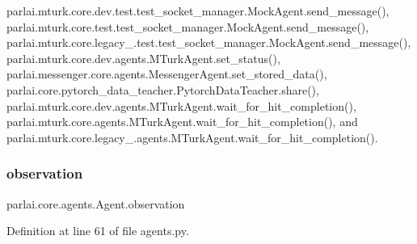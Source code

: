 parlai.\+mturk.\+core.\+dev.\+test.\+test\+\_\+socket\+\_\+manager.\+Mock\+Agent.\+send\+\_\+message(), parlai.\+mturk.\+core.\+test.\+test\+\_\+socket\+\_\+manager.\+Mock\+Agent.\+send\+\_\+message(), parlai.\+mturk.\+core.\+legacy\+\_.\+test.\+test\+\_\+socket\+\_\+manager.\+Mock\+Agent.\+send\+\_\+message(), parlai.\+mturk.\+core.\+dev.\+agents.\+M\+Turk\+Agent.\+set\+\_\+status(), parlai.\+messenger.\+core.\+agents.\+Messenger\+Agent.\+set\+\_\+stored\+\_\+data(), parlai.\+core.\+pytorch\+\_\+data\+\_\+teacher.\+Pytorch\+Data\+Teacher.\+share(), parlai.\+mturk.\+core.\+dev.\+agents.\+M\+Turk\+Agent.\+wait\+\_\+for\+\_\+hit\+\_\+completion(), parlai.\+mturk.\+core.\+agents.\+M\+Turk\+Agent.\+wait\+\_\+for\+\_\+hit\+\_\+completion(), and parlai.\+mturk.\+core.\+legacy\+\_.\+agents.\+M\+Turk\+Agent.\+wait\+\_\+for\+\_\+hit\+\_\+completion().

\mbox{\label{classparlai_1_1core_1_1agents_1_1Agent_aedbecc4b4aa7af7413882a0429e0f1db}} 
\subsubsection{\texorpdfstring{observation}{observation}}
{\footnotesize\ttfamily parlai.\+core.\+agents.\+Agent.\+observation}



Definition at line 61 of file agents.\+py.




